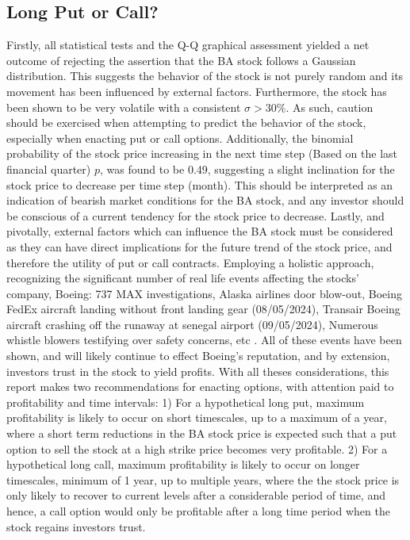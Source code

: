 \documentclass[
	a4paper, %
	11pt, %
	twoside, %
]{LTJournalArticle}
\begin{document}
\subsection{Long Put or Call?}
Firstly, all statistical tests and the Q-Q graphical assessment yielded a net outcome of rejecting the assertion that the BA stock follows a Gaussian distribution.
This suggests the behavior of the stock is not purely random and its movement has been influenced by external factors.
Furthermore, the stock has been shown to be very volatile with a consistent $\sigma>30\%$.
As such, caution should be exercised when attempting to predict the behavior of the stock, especially when enacting put or call options.
Additionally, the binomial probability of the stock price increasing in the next time step (Based on the last financial quarter) $p$, was found to be 0.49, suggesting a slight inclination for the stock price to decrease per time step (month).
This should be interpreted as an indication of bearish market conditions for the BA stock, and any investor should be conscious of a current tendency for the stock price to decrease.
Lastly, and pivotally, external factors which can influence the BA stock must be considered as they can have direct implications for the future trend of the stock price, and therefore the utility of put or call contracts.
Employing a holistic approach, recognizing the significant number of real life events affecting the stocks' company, Boeing: 737 MAX investigations, Alaska airlines door blow-out, Boeing FedEx aircraft landing without front landing gear (08/05/2024), Transair Boeing aircraft crashing off the runaway at senegal airport (09/05/2024), Numerous whistle blowers testifying over safety concerns, etc \cite{Extra_issues}.
All of these events have been shown, and will likely continue to effect Boeing's reputation, and by extension, investors trust in the stock to yield profits. 
With all theses considerations, this report makes two recommendations for enacting options, with attention paid to profitability and time intervals:
1) For a hypothetical long put, maximum profitability is likely to occur on short timescales, up to a maximum of a year, where a short term reductions in the BA stock price is expected such that a put option to sell the stock at a high strike price becomes very profitable.
2) For a hypothetical long call, maximum profitability is likely to occur on longer timescales, minimum of 1 year, up to multiple years, where the the stock price is only likely to recover to current levels after a considerable period of time, and hence, a call option would only be profitable after a long time period when the stock regains investors trust.
\end{document}
